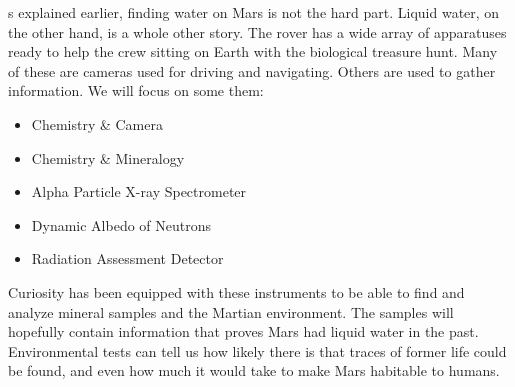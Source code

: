 s explained earlier, finding water on Mars is not the hard part.
Liquid water, on the other hand, is a whole other story.
The rover has a wide array of apparatuses ready to help the crew sitting on Earth with the biological treasure hunt.
Many of these are cameras used for driving and navigating.
Others are used to gather information.
We will focus on some them:

\begin{itemize}
\item Chemistry \& Camera
\item Chemistry \& Mineralogy
\item Alpha Particle X-ray Spectrometer
\item Dynamic Albedo of Neutrons
\item Radiation Assessment Detector
\end{itemize}

Curiosity has been equipped with these instruments to be able to find and analyze mineral samples and the Martian environment.
The samples will hopefully contain information that proves Mars had liquid water in the past.
Environmental tests can tell us how likely there is that traces of former life could be found, and even how much it would take to make Mars habitable to humans.